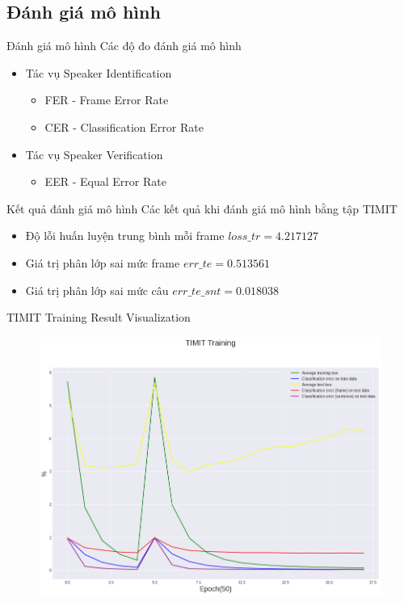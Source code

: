 \documentclass[notheorems, aspectratio=54]{beamer}
\begin{document}
\subsection{Đánh giá mô hình}
\begin{frame}{Đánh giá mô hình}
	Các độ đo đánh giá mô hình
	\begin{itemize}
		\item Tác vụ Speaker Identification
		\begin{itemize}
			\item FER - Frame Error Rate
			\item CER - Classification Error Rate
		\end{itemize}
		\item Tác vụ Speaker Verification
		\begin{itemize}
			\item EER - Equal Error Rate
		\end{itemize}
	\end{itemize}
\end{frame}
\begin{frame}{Kết quả đánh giá mô hình}
	Các kết quả khi đánh giá mô hình bằng tập TIMIT
	\begin{itemize}
		\item Độ lỗi huấn luyện trung bình mỗi frame $loss\_tr=4.217127$
		\item Giá trị phân lớp sai mức frame $err\_te=0.513561$
		\item Giá trị phân lớp sai mức câu $err\_te\_snt =0.018038$
	\end{itemize}
\end{frame}
\begin{frame}{TIMIT Training Result Visualization}
	\begin{figure}[H]
		\includegraphics[width=0.8\linewidth]{result/sincnet_timit_plot.png}
		\label{fig:writing-thesis}
	\end{figure}
\end{frame}
\end{document}
